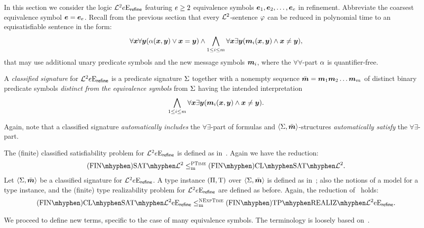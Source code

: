 In this section we consider the logic $\mathcal{L}^{2}_{{}}{e}\mathrm{E}_{\mathsf{refine}}$
featuring $e \geq 2$ equivalence symbols $\bm{e}_{1},\bm{e}_{2},\dots,\bm{e}_{e}$ in
refinement. Abbreviate the coarsest equivalence symbol $\bm{e} = \bm{e}_{e}$.
Recall from the previous section that every $\mathcal{L}^{2}$-sentence $\varphi$ can be
reduced in polynomial time to an equisatisfiable sentence in the form:
\begin{equation*}
  \forall\bm{x}\forall\bm{y} (\alpha(\bm{x},\bm{y}) \lor \bm{x} = \bm{y}) \land
  \bigwedge_{1 \leq i \leq m} \forall\bm{x}\exists\bm{y}
  (\bm{m}_{i}(\bm{x},\bm{y}) \land \bm{x} \neq \bm{y}),
\end{equation*}
that may use additional unary predicate symbols and the new message symbols
$\bm{m}_{i}$, where the $\forall\forall$-part $\alpha$ is quantifier-free.
\begin{definition}
A \emph{classified signature} for $\mathcal{L}^{2}_{{}}{e}\mathrm{E}_{\mathsf{refine}}$ is a
predicate signature $\mathrm{\Sigma}$ together with a nonempty sequence $\sms =
\smm1\smm2\dots\smm\nm$ of distinct binary predicate symbols \emph{distinct
from the equivalence symbols} from $\mathrm{\Sigma}$ having the intended interpretation
\begin{equation*}
  \bigwedge_{1 \leq i \leq m} \forall\bm{x}\exists\bm{y} 
  (\bm{m}_{i}(\bm{x},\bm{y}) \land \bm{x} \neq \bm{y}).
\end{equation*}
\end{definition}
Again, note that a classified signature \emph{automatically includes} the
$\forall\exists$-part of formulas and $\left\langle \mathrm{\Sigma},\bar{\bm{m}} \right\rangle$-structures
\emph{automatically satisfy} the $\forall\exists$-part.

The (finite) classified satisfiability problem for
$\mathcal{L}^{2}_{{}}{e}\mathrm{E}_{\mathsf{refine}}$ is defined as in~.
Again we have the reduction:
\[
  \FinASat{\vFo2} \red\cP \FinAClSat{\vFo2}.
\]
Let $\left\langle \mathrm{\Sigma},\bar{\bm{m}} \right\rangle$ be a classified signature for
$\mathcal{L}^{2}_{{}}{e}\mathrm{E}_{\mathsf{refine}}$.
A type instance $(\Pi,\mathrm{T})$ over $\left\langle \mathrm{\Sigma},\bar{\bm{m}} \right\rangle$ is defined as
in~; also the notions of a model for a type instance,
and the (finite) type realizability problem for
$\mathcal{L}^{2}_{{}}{e}\mathrm{E}_{\mathsf{refine}}$ are defined as before. 
Again, the reduction of~ holds:
\[
  \FinAClSat{\Lvp\Fo2\nopow\Eea\sze\agrefine} \red\cNExpTime
  \FinAReal{\Lvp\Fo2\nopow\Eea\sze\agrefine}.
\]

We proceed to define new terms, specific to the case of many equivalence
symbols.
The terminology is loosely based on~\cite{MALQ:MALQ201400102}.

